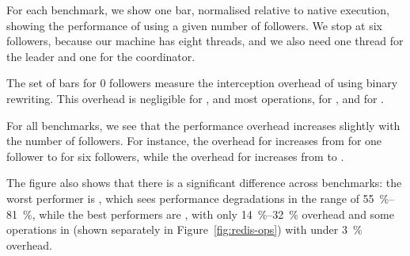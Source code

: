 For each benchmark, we show one bar, normalised relative to native
execution, showing the performance of \varan using a given number of
followers.  We stop at six followers, because our machine has eight
threads, and we also need one thread for the leader and one for the
coordinator.  

The set of bars for 0 followers measure the interception overhead
of \varan using binary rewriting.  This overhead is negligible for
\lighttpdtwo, \memcached and most \redis operations, \nginxIntercept for
\nginx, and \beanstalkdIntercept for \beanstalkd.

For all benchmarks, we see that the performance overhead increases
slightly with the number of followers.  For instance, the overhead for
\beanstalkd increases from \beanstalkdOneFollower for one follower to
\beanstalkdSixFollowers for six followers, while the overhead for
\memcached increases from \memcachedOneFollower to
\memcachedSixFollowers.

The figure also shows that there is a significant difference across
benchmarks: the worst performer is \beanstalkd, which sees performance
degradations in the range of \SIrange{55}{81}{\percent}, while the best performers are
\memcached, with only \SIrange{14}{32}{\percent} overhead and some operations in \redis
(shown separately in Figure~\ref{fig:redis-ops})
with under \SI{3}{\percent} overhead.
